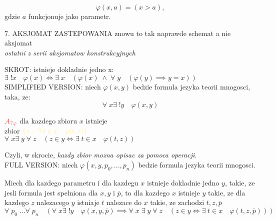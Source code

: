 \documentclass{article}
\begin{document}
  $$\varphi(x,a)=(x>a),$$
  gdzie $a$ funkcjonuje jako parametr.\bigskip
  \begin{center}
    \color{tit}7. AKSJOMAT ZASTEPOWANIA \color{txt}znowu to tak naprawde schemat a nie aksjomat\\
    \emph{\color{emp}ostatni z serii aksjomatow konstrukcyjnych}
  \end{center}
  \color{acc}SKROT: \color{txt}istnieje dokladnie jedno x:\smallskip\\
    $\exists\;!x\quad\varphi(x)\iff\exists\;x\quad(\varphi(x)\;\land\;\forall\;y\quad(\varphi(y)\implies y=x))$\bigskip\\
  \color{def}SIMPLIFIED VERSION: \color{txt}niech $\varphi(x,y)$ bedzie formula jezyka teorii mnogosci, taka, ze:
  $$\forall\;x\exists\;!y\quad \varphi(x,y)$$
  \begin{center}
    $\color{tit}A_{7\varphi}$ dla kazdego zbioru $x$ istnieje \\
    zbior $\color{acc}\{z:\;\exists\;t\in x\quad \varphi(t,z)\}$\smallskip\\
    $\forall\;x\exists\;y\;\forall\;z\quad(z\in y\iff\exists\;t\in x\quad \varphi(t,z))$
  \end{center}
  Czyli, w skrocie, \emph{\color{acc}kazdy zbior mozna opisac za pomoca operacji}.\bigskip\\
  \color{def}FULL VERSION: \color{txt}niech $\varphi(x,y,p_0,...,p_n)$ bedzie formula jezyka teorii mnogosci.
  \begin{center}
    Miech dla kazdego parametru i dla kazdegu $x$ istnieje dokladnie jedno $y$, takie, ze jesli formula jest spelniona dla $x,y$ i $\overline{p}$, to dla kazdego $x$ istnieje $y$ takie, ze dla kazdego $z$ nalezacego $y$ istniaje $t$ nalezace do $x$ takie, ze zachodzi $t,z,\overline{p}$\smallskip\\
    $\forall\;p_0\;...\forall\;p_n\quad(\forall\;x\exists\;!y\quad\varphi(x,y,\overline{p})\implies\forall\;x\;\exists\;y\;\forall\;z\quad(z\in y\iff \exists\;t\in x\quad \varphi(t,z,\overline{p})))$
  \end{center}
\end{document}
